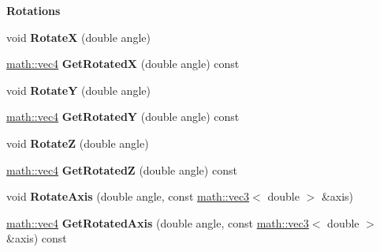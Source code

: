 \begin{Indent}{\bf Rotations}\par
{\em \label{_amgrpe3a9f3ceea2a861d915023ad0a1b98b0}
 }\begin{DoxyCompactItemize}
\item 
\hypertarget{classmath_1_1vec4_a4bf43cb3afb4e187ffed2637875c9660}{
void {\bfseries RotateX} (double angle)}
\label{classmath_1_1vec4_a4bf43cb3afb4e187ffed2637875c9660}

\item 
\hypertarget{classmath_1_1vec4_ad9e3089064aa618500cc6c1349f0195f}{
\hyperlink{classmath_1_1vec4}{math::vec4} {\bfseries GetRotatedX} (double angle) const }
\label{classmath_1_1vec4_ad9e3089064aa618500cc6c1349f0195f}

\item 
\hypertarget{classmath_1_1vec4_ad0f769ff6c8a5284033b7a527b695450}{
void {\bfseries RotateY} (double angle)}
\label{classmath_1_1vec4_ad0f769ff6c8a5284033b7a527b695450}

\item 
\hypertarget{classmath_1_1vec4_ad9edc7655b38874aadfa38a95c0aca94}{
\hyperlink{classmath_1_1vec4}{math::vec4} {\bfseries GetRotatedY} (double angle) const }
\label{classmath_1_1vec4_ad9edc7655b38874aadfa38a95c0aca94}

\item 
\hypertarget{classmath_1_1vec4_a349ebea54d9ce7c5ef463fca34459e57}{
void {\bfseries RotateZ} (double angle)}
\label{classmath_1_1vec4_a349ebea54d9ce7c5ef463fca34459e57}

\item 
\hypertarget{classmath_1_1vec4_ac3b83e41a9bf6363a09bd3d408ca15a9}{
\hyperlink{classmath_1_1vec4}{math::vec4} {\bfseries GetRotatedZ} (double angle) const }
\label{classmath_1_1vec4_ac3b83e41a9bf6363a09bd3d408ca15a9}

\item 
\hypertarget{classmath_1_1vec4_a17b10f51b8f7b637edbfe2b7415937fc}{
void {\bfseries RotateAxis} (double angle, const \hyperlink{classmath_1_1vec3}{math::vec3}$<$ double $>$ \&axis)}
\label{classmath_1_1vec4_a17b10f51b8f7b637edbfe2b7415937fc}

\item 
\hypertarget{classmath_1_1vec4_a2237817b18e8668f0f86b231090fe1a5}{
\hyperlink{classmath_1_1vec4}{math::vec4} {\bfseries GetRotatedAxis} (double angle, const \hyperlink{classmath_1_1vec3}{math::vec3}$<$ double $>$ \&axis) const }
\label{classmath_1_1vec4_a2237817b18e8668f0f86b231090fe1a5}

\end{DoxyCompactItemize}
\end{Indent}
